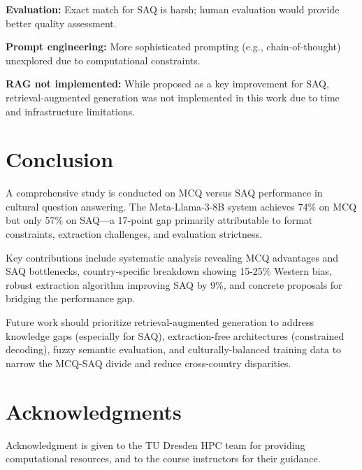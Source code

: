 \documentclass[11pt,a4paper,twocolumn]{article}
\begin{document}
\textbf{Evaluation:} Exact match for SAQ is harsh; human evaluation would provide better quality assessment.

\textbf{Prompt engineering:} More sophisticated prompting (e.g., chain-of-thought) unexplored due to computational constraints.

\textbf{RAG not implemented:} While proposed as a key improvement for SAQ, retrieval-augmented generation was not implemented in this work due to time and infrastructure limitations.

\section{Conclusion}

A comprehensive study is conducted on MCQ versus SAQ performance in cultural question answering. The Meta-Llama-3-8B system achieves 74\% on MCQ but only 57\% on SAQ—a 17-point gap primarily attributable to format constraints, extraction challenges, and evaluation strictness.

Key contributions include systematic analysis revealing MCQ advantages and SAQ bottlenecks, country-specific breakdown showing 15-25\% Western bias, robust extraction algorithm improving SAQ by 9\%, and concrete proposals for bridging the performance gap.

Future work should prioritize retrieval-augmented generation to address knowledge gaps (especially for SAQ), extraction-free architectures (constrained decoding), fuzzy semantic evaluation, and culturally-balanced training data to narrow the MCQ-SAQ divide and reduce cross-country disparities.

\section*{Acknowledgments}

Acknowledgment is given to the TU Dresden HPC team for providing computational resources, and to the course instructors for their guidance.
\end{document}
